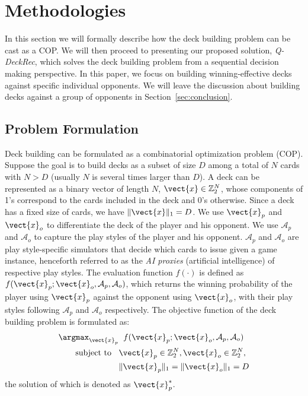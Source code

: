 

\section{Methodologies}\label{sec:method}
In this section we will formally describe how the deck building problem can be cast as a COP. We will then proceed to presenting our proposed solution, \textit{Q-DeckRec}, which solves the deck building problem from a sequential decision making perspective. In this paper, we focus on building winning-effective decks against specific individual opponents. We will leave the discussion about building decks against a group of opponents in Section~\ref{sec:conclusion}. 

\subsection{Problem Formulation}
Deck building can be formulated as a combinatorial optimization problem (COP). 
Suppose the goal is to build decks as a subset of size $D$ among a total of $N$ cards with $N > D $ (usually $N$ is several times larger than $D$). A deck can be represented as a binary vector of length $N$, $ \vect{x} \in \mathbb{Z}_2^N$, whose components of 1's correspond to the cards included in the deck and 0's otherwise. Since a deck has a fixed size of cards, we have $\|\vect{x}\|_1=D$. We use $\vect{x}_p$ and $\vect{x}_o$ to differentiate the deck of the player and his opponent. We use $\mathcal{A}_p$ and $\mathcal{A}_o$ to capture the play styles of the player and his opponent. $\mathcal{A}_p$ and $\mathcal{A}_o$ are play style-specific simulators that decide which cards to issue given a game instance, henceforth referred to as the \textit{AI proxies} (artificial intelligence) of respective play styles. The evaluation function $f(\cdot)$ is defined as $f(\vect{x}_p; \vect{x}_o, \mathcal{A}_p, \mathcal{A}_o)$, which returns the winning probability of the player using $\vect{x}_p$ against the opponent using $\vect{x}_o$, with their play styles following $\mathcal{A}_p$ and $\mathcal{A}_o$ respectively. The objective function of the deck building problem is formulated as:
\begin{align}
\begin{split}
\argmax_{\vect{x}_p} & \;\; f(\vect{x}_p; \vect{x}_o, \mathcal{A}_p, \mathcal{A}_o) \\
\text{subject to } \;\;&\vect{x}_p \in \mathbb{Z}_2^N, \vect{x}_o \in \mathbb{Z}_2^N, \\
&\|\vect{x}_p\|_1=\|\vect{x}_o\|_1=D
\end{split}
\label{eqn:obj}
\end{align}
the solution of which is denoted as $\vect{x}_p^*$.

